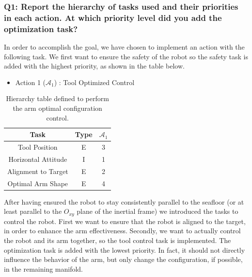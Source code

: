 \documentclass{article}
\begin{document}
\subsubsection{Q1: Report the hierarchy of tasks used and their priorities in each action. At which priority level did you add the optimization task?}
In order to accomplish the goal, we have chosen to implement an action with the following task. We first want to ensure the safety of the robot so the safety task is added with the highest priority, as shown in the table below. 
\begin{table}[htb]
	\caption{Hierarchy table defined to perform the arm optimal configuration control.}
	\begin{itemize}
		\item Action 1 ($\mathcal{A}_{1}$) : Tool Optimized Control
	\end{itemize}
	\label{tb7:ex5.1.1HierarchyTable}
	\begin{center}
		\footnotesize
		\begin{tabular}{ccc}
			\toprule
			Task & Type & $\mathcal{A}_{1}$  \\
			\midrule
			Tool Position                   & E & 3  \\
			\hdashline
			Horizontal Attitude             & I & 1  \\
			\hdashline
			Alignment to Target           	& E & 2  \\
			\hdashline
			Optimal Arm Shape				& E & 4  \\
			\bottomrule
		\end{tabular}
	\end{center}
\end{table}
After having ensured the robot to stay consistently parallel to the seafloor (or at least parallel to the $ O_{xy} $ plane of the inertial frame) we introduced the tasks to control the robot. First we want to ensure that the robot is aligned to the target, in order to enhance the arm effectiveness. Secondly, we want to actually control the robot and its arm together, so the tool control task is implemented. The optimization task is added with the lowest priority. In fact, it should not directly influence the behavior of the arm, but only change the configuration, if possible, in the remaining manifold. 
\end{document}
